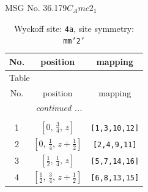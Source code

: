 \documentclass[fleqn,8pt]{jsarticle}
\begin{document}
\setcounter{MaxMatrixCols}{32}

\renewcommand{\tablename}{Table~}
\renewcommand{\figurename}{Figure~}
\begin{center}
\LARGE
MSG No. 36.179\quad$C_{A}mc2_{1}$
\end{center}
\renewcommand{\arraystretch}{1.2}
\begin{longtable}{ccc}
\caption{Wyckoff site: {\tt 4a}, site symmetry: {\tt mm'2'}}
 \\
 \hline \hline
No. & position & mapping \\ \hline \endfirsthead

\multicolumn{2}{l}{\tablename\ \thetable{}} \\
 \hline \hline
No. & position & mapping \\ \hline \endhead

 \hline \hline
\multicolumn{2}{r}{\footnotesize\it continued ...} \\ \endfoot

 \hline \hline
\multicolumn{2}{r}{} \\ \endlastfoot

1 & $\left[ 0,\, \frac{3}{4},\, z \right]$ & {\tt [1,3,10,12]} \\ \hline
2 & $\left[ 0,\, \frac{1}{4},\, z + \frac{1}{2} \right]$ & {\tt [2,4,9,11]} \\ \hline
3 & $\left[ \frac{1}{2},\, \frac{1}{4},\, z \right]$ & {\tt [5,7,14,16]} \\ \hline
4 & $\left[ \frac{1}{2},\, \frac{3}{4},\, z + \frac{1}{2} \right]$ & {\tt [6,8,13,15]} \\
\end{longtable}
\renewcommand{\arraystretch}{1.2}
\end{document}
